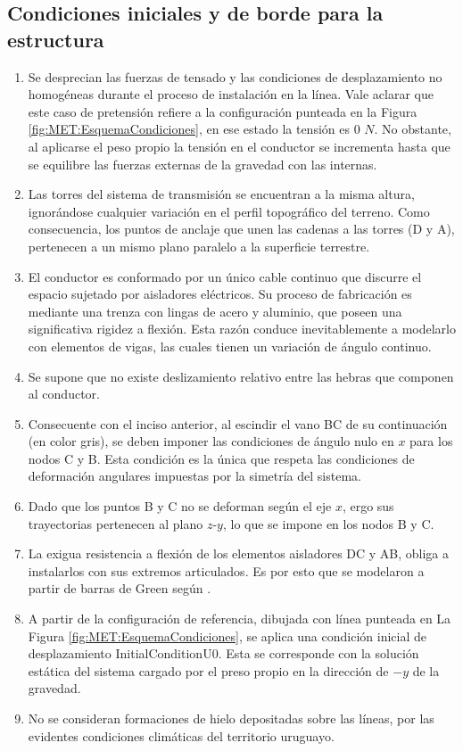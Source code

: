 \subsection{Condiciones iniciales y de borde para la estructura}\label{Sec:MET:ModeladoEstructural}
\begin{enumerate}
	\item  Se desprecian las fuerzas de tensado y las condiciones de desplazamiento no homogéneas durante el proceso de instalación en la línea. Vale aclarar que este caso de pretensión refiere a la configuración punteada en la Figura \ref{fig:MET:EsquemaCondiciones}, en ese estado la tensión es 0 $N$. No obstante, al aplicarse el peso propio la tensión en el conductor se incrementa hasta que se equilibre las fuerzas externas de la gravedad con las internas. 
	\item Las torres del sistema de transmisión se encuentran a la misma altura, ignorándose cualquier variación en el perfil topográfico del terreno. Como consecuencia, los puntos de anclaje que unen las cadenas a las torres (D y A), pertenecen a un mismo plano paralelo a la superficie terrestre.
	\item  El conductor es conformado por un único cable continuo que discurre el espacio sujetado por aisladores eléctricos. Su proceso de fabricación es mediante una trenza con lingas de acero y aluminio, que poseen una significativa rigidez a flexión. Esta razón conduce inevitablemente a modelarlo con elementos de vigas, las cuales tienen un variación de ángulo continuo.
	\item Se supone que no existe deslizamiento relativo entre las hebras que componen al conductor.  
	\item Consecuente con el inciso anterior, al escindir el vano BC de su continuación (en color gris), se deben imponer las condiciones de ángulo nulo en $x$ para los nodos C y B. Esta condición es la única que respeta las condiciones de deformación angulares impuestas por la simetría del sistema.
	\item Dado que los puntos B y C no se deforman según el eje $x$, ergo sus trayectorias pertenecen al plano $z$-$y$, lo que se impone en los nodos B y C. 
	\item La exigua resistencia a flexión de los elementos aisladores DC y AB, obliga a instalarlos con sus extremos articulados. Es por esto que se modelaron a partir de barras de Green según \cite{Crisfield}. 
	\item A partir de la configuración de referencia, dibujada con línea punteada en La Figura \ref{fig:MET:EsquemaCondiciones}, se aplica una condición inicial de desplazamiento \gls{InitialConditionU0}. Esta se corresponde con la solución estática del sistema cargado por el preso propio en la dirección de $-y$ de la gravedad.
	\item No se consideran formaciones de hielo depositadas sobre las líneas, por las evidentes condiciones climáticas del territorio uruguayo.
\end{enumerate} 

